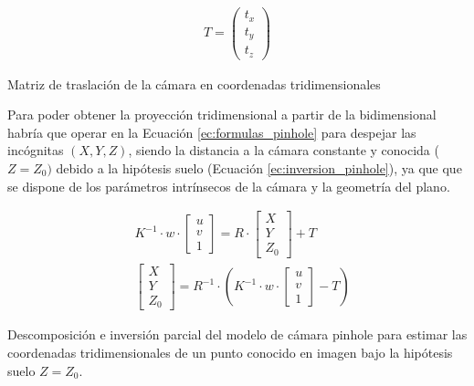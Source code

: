   \begin{myequation}[H]
    \begin{align}
      T =
      \begin{pmatrix}
        t_x \\
        t_y \\
        t_z
      \end{pmatrix}
    \nonumber
    \end{align}
    \caption{Matriz de traslación de la cámara en coordenadas tridimensionales}
    \label{ec:matriz_traslacion}
  \end{myequation}


Para poder obtener la proyección tridimensional a partir de la bidimensional habría que operar en la Ecuación \ref{ec:formulas_pinhole} para despejar las incógnitas \((X, Y, Z)\), siendo la distancia a la cámara constante y conocida (\( Z = Z_0) \) debido a la hipótesis suelo (Ecuación \ref{ec:inversion_pinhole}), ya que que se dispone de los parámetros intrínsecos de la cámara y la geometría del plano.

  \begin{myequation}[H]
    \begin{align*}
      &K^{-1} \cdot w \cdot 
      \begin{bmatrix}
        u \\
        v \\
        1
      \end{bmatrix}
      =
      R \cdot 
      \begin{bmatrix}
        X \\
        Y \\
        Z_0
      \end{bmatrix}
      + T \\[2ex]
      &\begin{bmatrix}
        X \\
        Y \\
        Z_0
      \end{bmatrix}
      =
      R^{-1} \cdot 
      \left(
      K^{-1} \cdot w \cdot 
      \begin{bmatrix}
        u \\
        v \\
        1
      \end{bmatrix}
      - T
      \right)
    \end{align*}
    \caption{Descomposición e inversión parcial del modelo de cámara pinhole para estimar las coordenadas tridimensionales de un punto conocido en imagen bajo la hipótesis suelo \(Z = Z_0\).}
    \label{ec:inversion_pinhole}
  \end{myequation}

